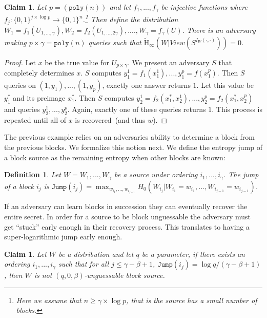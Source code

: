 \documentclass[11pt]{article}
\newcommand{\zo}{\ensuremath{\{0, 1\}}}
\newcommand{\poly}{\ensuremath{\mathtt{poly}}\xspace}
\newcommand{\Hav}{\tilde{\mathrm{H}}_\infty}
\newtheorem{definition}[theorem]{Definition}
\newtheorem{claim}[theorem]{Claim}
\begin{document}
\begin{claim}
Let $p = (\poly(n))$ and let $f_1,..., f_{\gamma}$ be injective functions where $f_j:\zo^{j\times \log p}\rightarrow \zo^n$.\footnote{Here we assume that $n\ge \gamma \times \log p$, that is the source has a small number of blocks.}  Then define the distribution $W_1 = f_1(U_{1,...,\gamma}), W_2 = f_2(U_{1,..., 2\gamma}),...., W_\gamma = f_\gamma(U)$.  There is an adversary making $p\times \gamma = \poly(n)$ queries such that $\Hav(W | View(S^{I_W(\cdot, \cdot)})) = 0$.
\end{claim}
\begin{proof}
Let $x$ be the true value for $U_{p\times \gamma}$.
We present an adversary $S$ that completely determines $x$.  $S$ computes $y_1^1 = f_1(x_1^1),..., y_1^p = f(x_1^p)$.  Then $S$ queries on $(1, y_1),..., (1, y_p)$, exactly one answer returns $1$.  Let this value be $y_1^*$ and its preimage $x_1^*$.  Then $S$ computes $y_2^1 = f_2(x_1^*,x_2^1), ..., y_2^p= f_2(x_1^*, x_2^p)$ and queries $y_2^1,..., y_2^p$.  Again, exactly one of these queries returns $1$.  This process is repeated until all of $x$ is recovered~(and thus $w$).  %
\end{proof}

The previous example relies on an adversaries ability to determine a block from the previous blocks.  We formalize this notion next.  We define the entropy jump of a block source as the remaining entropy when other blocks are known:

\begin{definition}
Let $W = W_1,..., W_\gamma$ be a source under ordering $i_1,..., i_\gamma$.  The \emph{jump} of a block $i_j$ is $\mathtt{Jump}(i_j) = \max_{w_{i_1},..., w_{i_{j-1}}} H_0 (W_{i_j} | W_{i_1} = w_{i_1} ,..., W_{i_{j-1}} = w_{i_{j-1}})$.
\end{definition}

If an adversary can learn blocks in succession they can eventually recover the entire secret.  In order for a source to be block unguessable the adversary must get ``stuck'' early enough in their recovery process.  This translates to having a super-logarithmic jump early enough.

\begin{claim}
Let $W$ be a distribution and let $q$ be a parameter, if there exists an ordering $i_1,..., i_\gamma$ such that for all $j\le \gamma-\beta +1$, $\mathtt{Jump}(i_j) = \log q /(\gamma-\beta+1)$, then $W$ is not $(q, 0, \beta)$-unguessable block source.
\end{claim}
\end{document}
